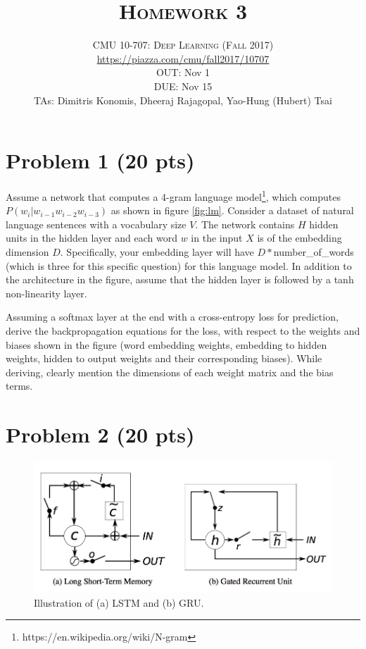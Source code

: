 \documentclass[10pt]{article}
\title{\textsc{Homework 3}} %
\author{CMU 10-707: \textsc{Deep Learning (Fall 2017)} \\
\url{https://piazza.com/cmu/fall2017/10707} \\
OUT: Nov 1 \\
DUE: Nov 15 \\ 
TAs: Dimitris Konomis, Dheeraj Rajagopal, Yao-Hung (Hubert) Tsai}
\date{}
\begin{document}
\maketitle
\setcounter{page}{1}




\section{Problem 1 (20 pts)}

Assume a network that computes a 4-gram language model\footnote{https://en.wikipedia.org/wiki/N-gram}, which computes $P(w_i | w_{i-1} w_{i-2} w_{i-3})$ as shown in figure \ref{fig:lm}. 
Consider a dataset of natural language sentences with a vocabulary size $V$. The network contains $H$ hidden units in the hidden layer and each word $w$ in the input $X$ is of the embedding dimension $D$. Specifically, your embedding layer will have $D*$number\_of\_words (which is three for this specific question) for this language model. In addition to the architecture in the figure, assume that the hidden layer is followed by a tanh non-linearity layer.

Assuming a softmax layer at the end with a cross-entropy loss for prediction, derive the backpropagation equations for the loss, with respect to the weights and biases shown in the figure (word embedding weights, embedding to hidden weights, hidden to output weights and their corresponding biases). While deriving, clearly mention the dimensions of each weight matrix and the bias terms. 


\section{Problem 2 (20 pts)}

\begin{figure}[h]
  \centering
  \vspace{-0.2in}
  \includegraphics[width=0.8\linewidth]{lstm_gru.png}
  \vspace{-0.2in}
  \caption{Illustration of (a) LSTM and (b) GRU.}
  \label{fig:lstm_gru}
\end{figure}
\end{document}
